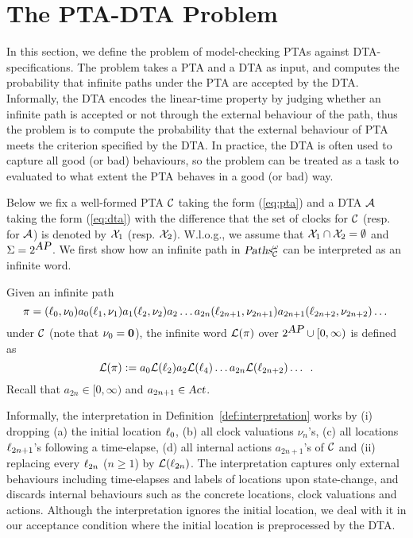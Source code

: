 \section{The PTA-DTA Problem}
In this section, we define the problem of model-checking PTAs against DTA-specifications.
The problem takes a PTA and a DTA as input, and computes the probability that infinite paths under the PTA are accepted by the DTA.
Informally, the DTA encodes the linear-time property by judging whether an infinite path is accepted or not through the external behaviour of the path,
thus the problem is to compute the probability that the external behaviour of PTA meets the criterion specified by the DTA.
In practice, the DTA is often used to capture all good (or bad) behaviours, so the problem can be treated as a task to evaluated to what extent the PTA behaves in a good (or bad) way.

Below we fix a well-formed PTA $\mathcal{C}$ taking the form (\ref{eq:pta}) and a DTA $\mathcal{A}$ taking the form (\ref{eq:dta}) 
with the difference that the set of clocks for $\mathcal{C}$ (resp. for $\mathcal{A}$) is denoted by $\mathcal{X}_1$ (resp. $\mathcal{X}_2$).
W.l.o.g., we assume that $\mathcal{X}_1\cap\mathcal{X}_2=\emptyset$ and $\Sigma=2^{\mbox{\sl AP}}$.
We first show how an infinite path in $\mbox{\sl Paths}^\omega_{\mathcal{C}}$ can be interpreted as an infinite word.
% 
\begin{definition}\label{def:interpretation}
Given an infinite path
\[
\pi=(\ell_0,\nu_0)a_0(\ell_1,\nu_1)a_1(\ell_2,\nu_2)a_2\dots a_{2n}(\ell_{2n+1},\nu_{2n+1})a_{2n+1}(\ell_{2n+2},\nu_{2n+2})\dots
\]
under $\mathcal{C}$ (note that $\nu_0=\mathbf{0}$), the infinite word $\mathcal{L}(\pi)$ over $2^{\mbox{\sl AP}}\cup[0,\infty)$ is defined as 
\[
\mathcal{L}(\pi):=a_0\mathcal{L}(\ell_2)a_2\mathcal{L}(\ell_4)\dots a_{2n}\mathcal{L}(\ell_{2n+2}) \dots\enskip.
\]
Recall that $a_{2n}\in [0,\infty)$ and $a_{2n+1}\in\mbox{\sl Act}$. 
\end{definition}

\begin{remark}
Informally, the interpretation in Definition~\ref{def:interpretation} works
by (i) dropping (a) the initial location $\ell_0$, (b) all clock valuations $\nu_n$'s, 
(c) all locations $\ell_{2n+1}$'s following a time-elapse,
(d) all internal actions $a_{2n+1}$'s of $\mathcal{C}$ and (ii) replacing every $\ell_{2n}$ ($n\ge 1$) by $\mathcal{L}(\ell_{2n})$.
The interpretation captures only external behaviours including time-elapses and labels of locations upon state-change, and discards internal behaviours such as the concrete locations, clock valuations and actions.
Although the interpretation ignores the initial location,
we deal with it in our acceptance condition where the initial location is preprocessed by the DTA.
\end{remark}

